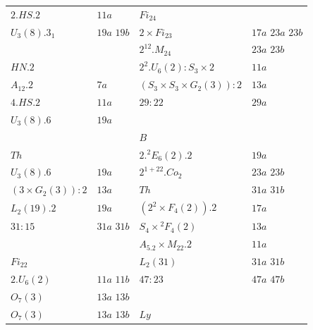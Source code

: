 \documentclass{article}
\theoremstyle{remark}
\theoremstyle{definition}
\begin{document}
\begin{table}
\begin{tabular}{|l | l || l | l|}
$2.HS.2 $                     & $11a$             & \underline{$Fi_{24}$}                              &  \\
$U_3(8).3_1$                   &  $19a$   $19b$    & $2\times Fi_{23}$                      &  $17a$   $23a$   $23b$  \\
                            &                   & $2^{12}.M_{24}$                          &  $23a$   $23b$  \\
\underline{$HN.2$}                       &                   & $2^2.U_6(2):S_3\times 2$              & $11a$ \\
$A_{12}.2$                       & $7a$              & $(S_3\times S_3\times G_2(3)):2$       & $13a$ \\
$4.HS.2$                      & $11a$             & $29:22$                              &  $29a$  \\
$U_3(8).6$                     &  $19a$            &                                   &  \\
                            &                   & \underline{$B$}                                 &  \\
\underline{$Th$}                          &                   & $2.{}^2E_6(2).2$                        &  $19a$  \\
$U_3(8).6$                     &  $19a$            & $2^{1+22}.Co_2$                      &  $23a$   $23b$  \\
$(3\times G_2(3)):2$           & $13a$             & $Th$                                &  $31a$   $31b$  \\
$L_2(19).2$                    &  $19a$            & $(2^2 \times  F_4(2)).2$             &  $17a$  \\
$31:15$                   &  $31a$   $31b$    & $S_4\times {}^2F_4(2)$                & $13a$ \\
                            &                   & $A_5.2\times M_{22}.2$                  & $11a$ \\
\underline{$Fi_{22}$}                        &                   & $L_2(31)$                            &  $31a$   $31b$  \\
$2.U_6(2)$                     & $11a$ $11b$       & $47:23$                               & $47a$ $47b$ \\
$O_7(3)$                       & $13a$ $13b$       &                                   &  \\
$O_7(3)$                      & $13a$ $13b$       & \underline{$Ly$}                                &  \\

\end{tabular}
\end{table}
\end{document}
